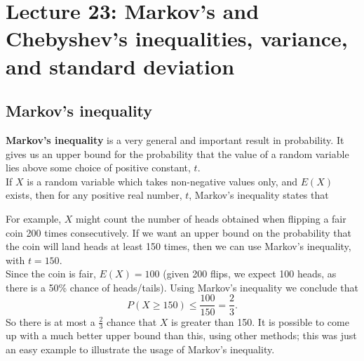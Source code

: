 \chapter{Lecture 23: Markov's and Chebyshev's inequalities, variance, and standard deviation}

\section{Markov's inequality} \label{markovs ineq}
\textbf{Markov's inequality} is a very general and important result in probability. It gives us an upper bound for the probability that the value of a random variable lies above some choice of positive constant, $t$. \\

\noindent If $X$ is a random variable which takes non-negative values only, and $E(X)$ exists, then for any positive real number, $t$, Markov's inequality states that

  	\bigskip
	
	\hfil{}
	\bigskip
	\bigskip
	
\noindent For example, $X$ might count the number of heads obtained when flipping a fair coin 200 times consecutively. If we want an upper bound on the probability that the coin will land heads at least 150 times, then we can use Markov's inequality, with $t = 150.$ \\

\noindent Since the coin is fair, $E(X) = 100$ (given 200 flips, we expect 100 heads, as there is a 50\% chance of heads/tails). Using Markov's inequality we conclude that 
\[
P(X \geq 150) \leq \frac{100}{150} = \frac{2}{3}. 
\]
So there is at most a $\frac{2}{3}$ chance that $X$ is greater than 150. It is possible to come up with a much better upper bound than this, using other methods; this was just an easy example to illustrate the usage of Markov's inequality. \\

